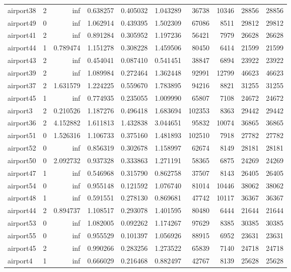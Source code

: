 \begin{longtable}{|l|r|r|r|r|r|r|r|r|r|}
airport38 & 2 & inf & 0.638257 & 0.405032 & 1.043289 & 36738 & 10346 & 28856 & 28856 \\
airport49 & 0 & inf & 1.062914 & 0.439395 & 1.502309 & 67086 & 8511 & 29812 & 29812 \\
airport41 & 2 & inf & 0.891284 & 0.305952 & 1.197236 & 56421 & 7979 & 26628 & 26628 \\
airport44 & 1 & 0.789474 & 1.151278 & 0.308228 & 1.459506 & 80450 & 6414 & 21599 & 21599 \\
airport43 & 2 & inf & 0.454041 & 0.087410 & 0.541451 & 38847 & 6894 & 23922 & 23922 \\
airport39 & 2 & inf & 1.089984 & 0.272464 & 1.362448 & 92991 & 12799 & 46623 & 46623 \\
airport37 & 2 & 1.631579 & 1.224225 & 0.559670 & 1.783895 & 94216 & 8821 & 31255 & 31255 \\
airport45 & 1 & inf & 0.774935 & 0.235055 & 1.009990 & 65807 & 7108 & 24672 & 24672 \\
airport3 & 2 & 0.210526 & 1.187276 & 0.496418 & 1.683694 & 102353 & 8363 & 29442 & 29442 \\
airport36 & 2 & 4.152882 & 1.611813 & 1.432838 & 3.044651 & 95832 & 10074 & 36865 & 36865 \\
airport51 & 0 & 1.526316 & 1.106733 & 0.375160 & 1.481893 & 102510 & 7918 & 27782 & 27782 \\
airport52 & 0 & inf & 0.856319 & 0.302678 & 1.158997 & 62674 & 8149 & 28181 & 28181 \\
airport50 & 0 & 2.092732 & 0.937328 & 0.333863 & 1.271191 & 58365 & 6875 & 24269 & 24269 \\
airport47 & 1 & inf & 0.546968 & 0.315790 & 0.862758 & 37507 & 8143 & 26405 & 26405 \\
airport54 & 0 & inf & 0.955148 & 0.121592 & 1.076740 & 81014 & 10446 & 38062 & 38062 \\
airport48 & 1 & inf & 0.591551 & 0.278130 & 0.869681 & 47742 & 10117 & 36367 & 36367 \\
airport44 & 2 & 0.894737 & 1.108517 & 0.293078 & 1.401595 & 80480 & 6444 & 21644 & 21644 \\
airport53 & 0 & inf & 1.082005 & 0.092262 & 1.174267 & 97629 & 8385 & 30385 & 30385 \\
airport55 & 0 & inf & 0.955529 & 0.101397 & 1.056926 & 88915 & 6952 & 23631 & 23631 \\
airport45 & 2 & inf & 0.990266 & 0.283256 & 1.273522 & 65839 & 7140 & 24718 & 24718 \\
airport4 & 1 & inf & 0.666029 & 0.216468 & 0.882497 & 42767 & 8139 & 25628 & 25628 \\

\end{longtable}
